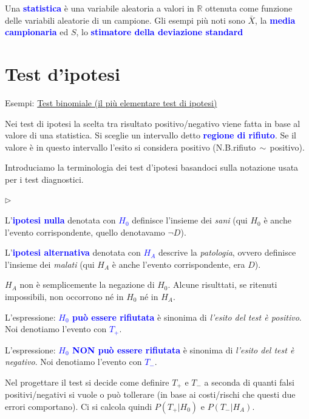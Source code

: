 \documentclass[12pt,openany]{book}
\def\RR{\mathds R}
\newcommand{\mylabel}[1]{{\footnotesize\textsf{#1}}\hfill}
\renewenvironment{itemize}
  {\begin{list}{$\triangleright$}{%
   \setlength{\parskip}{0mm}
   \setlength{\topsep}{.2\baselineskip}
   \setlength{\rightmargin}{0mm}
   \setlength{\listparindent}{0mm}
   \setlength{\itemindent}{0mm}
   \setlength{\labelwidth}{3ex}
   \setlength{\itemsep}{.4\baselineskip}
   \setlength{\parsep}{0mm}
   \setlength{\partopsep}{0mm}
   \setlength{\labelsep}{1ex}
   \setlength{\leftmargin}{\labelwidth+\labelsep}
   \let\makelabel\mylabel}}{%
   \end{list}\vspace*{-1.3mm}}
\def\emph#1{\textcolor{blue}{\textbf{\boldmath #1}}}
\theoremstyle{mio}
\theoremstyle{liscio}
\begin{document}
Una \emph{statistica\/} è una variabile aleatoria a valori in $\RR$ ottenuta come funzione delle variabili aleatorie di un campione. Gli esempi più noti sono $\bar X$, la \emph{media campionaria\/} ed $S$, lo \emph{stimatore della deviazione standard\/} 

\ceq{\hfill \emph{$\bar X$}}{=}{\frac1n\sum_{i=1}^n X_i}

\ceq{\hfill  \emph{$S$}}{=}{\sqrt{\frac1{n-1}\sum_{i=1}^n (X_i-\bar X)^2}}
 




\clearpage\section{Test d'ipotesi}

Esempi: \hyperref[Bernoulli_test]{Test binomiale (il più elementare test di ipotesi) \faShare}

Nei test di ipotesi la scelta tra risultato positivo/negativo viene fatta in base al valore di una statistica. Si sceglie un intervallo detto \emph{regione di rifiuto\/}. Se il valore è in questo intervallo l'esito si considera positivo (N.B.\@ rifiuto$\,\sim\,$positivo).

Introduciamo la terminologia dei test d'ipotesi basandoci sulla notazione usata per i test diagnostici.

\begin{itemize}
\item L'\emph{ipotesi nulla\/} denotata con \emph{$H_0$} definisce l'insieme dei \textit{sani\/} (qui $H_0$ è anche l'evento corrispondente, quello denotavamo $\neg D$). 

\item L'\emph{ipotesi alternativa\/} denotata con \emph{$H_A$}  descrive la \textit{patologia}, ovvero definisce l'insieme dei \textit{malati\/} (qui $H_A$ è anche l'evento corrispondente, era $D$).

\item $H_A$ non è semplicemente la negazione di $H_0$. Alcune risulttati, se ritenuti impossibili, non occorrono né in $H_0$ né in $H_A$.

\item L'espressione: \emph{$H_0$ può essere rifiutata\/} è sinonima di \textit{l'esito del test è positivo}. Noi denotiamo l'evento con \emph{$T_+$}.


\item L'espressione: \emph{$H_0$ NON può essere rifiutata\/} è sinonima di \textit{l'esito del test è negativo}. Noi denotiamo l'evento con \emph{$T_-$}.

\item Nel progettare il test si decide come definire $T_+$ e $T_-$ a seconda di quanti falsi positivi/negativi si vuole o può tollerare (in base ai costi/rischi che questi due errori comportano). Ci si calcola quindi $P(T_+|H_0)$ e $P(T_-|H_A)$.
\end{itemize}
\end{document}
